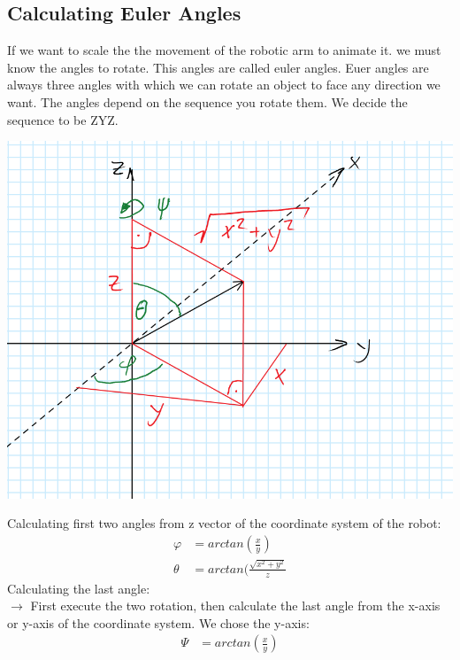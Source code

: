 \subsection{Calculating Euler Angles}
If we want to scale the the movement of the robotic arm to animate it. we must know the angles to rotate. This angles are called euler angles. Euer angles are always three angles with which we can rotate an object to face any direction we want. The angles depend on the sequence you rotate them. We decide the sequence to be ZYZ.\\
\begin{minipage}{0.5\textwidth}
\includegraphics[width=\textwidth]{imgs/AngleCalc/eulerangles.png}
\end{minipage}
\begin{minipage}{0.5\textwidth}
Calculating first two angles from z vector of the coordinate system of the robot:\\
\begin{align*}
\varphi &= arctan(\frac{x}{y})\\
\theta &= arctan(\frac{\sqrt{x^2+y^2}}{z}
\end{align*}
Calculating the last angle:\\
$\rightarrow$ First execute the two rotation, then calculate the last angle from the x-axis or y-axis of the coordinate system. We chose the y-axis:\\
\begin{align*}
\Psi &= arctan(\frac{x}{y})
\end{align*}
\end{minipage}

